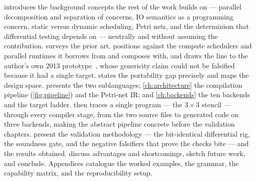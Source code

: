  introduces the background concepts the rest of the work
builds on --- parallel decomposition and separation of concerns, IO semantics as
a programming concern, static versus dynamic scheduling, Petri nets, and the
determinism that differential testing depends on --- neutrally and without
assuming the contribution.
 surveys the prior art, positions \nuc{} against the compute
schedulers and parallel runtimes it borrows from and composes with, and draws
the line to the author's own 2013 prototype~\cite{mped2013nuc}, whose genericity
claim could not be falsified because it had a single target.
 states the portability gap precisely and maps the design
space.  presents the two sublanguages; \cref{ch:architecture}
the compilation pipeline (\cref{fig:pipeline}) and the Petri-net IR; and
\cref{ch:backends} the ten backends and the target ladder.
 then traces a single program --- the $3\times3$ stencil ---
through every compiler stage, from the two source files to generated code on three
backends, making the abstract pipeline concrete before the validation chapters.
 present the validation methodology --- the
bit-identical differential rig, the soundness gate, and the negative falsifiers
that prove the checks bite --- and the results obtained.
 discuss advantages and
shortcomings, sketch future work, and conclude. Appendices catalogue the worked
examples, the grammar, the capability matrix, and the reproducibility setup.
